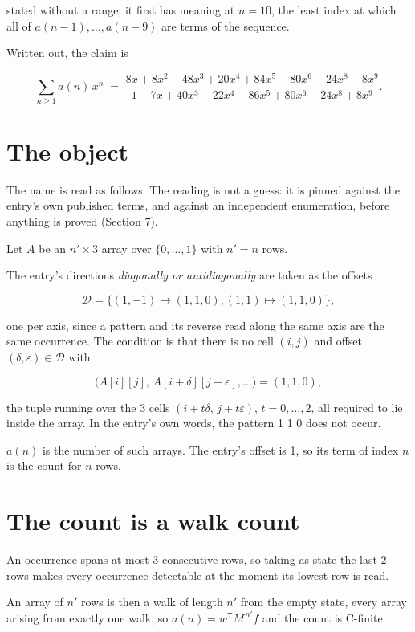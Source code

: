 \documentclass[11pt]{article}
\theoremstyle{definition}
\begin{document}
stated without a range; it first has meaning at $n = 10$, the least index at which all of $a(n-1),\dots,a(n-9)$ are terms of the sequence.

Written out, the claim is

\[\sum_{n \ge 1} a(n)\,x^n \;=\; \frac{8x + 8x^{2} - 48x^{3} + 20x^{4} + 84x^{5} - 80x^{6} + 24x^{8} - 8x^{9}}{1 - 7x + 40x^{3} - 22x^{4} - 86x^{5} + 80x^{6} - 24x^{8} + 8x^{9}}.\]

\section{The object}

The name is read as follows. The reading is not a guess: it is pinned against the entry's own published terms, and against an independent enumeration, before anything is proved (Section 7).

Let $A$ be an $n' \times 3$ array over $\{0,\dots,1\}$ with $n' = n$ rows.

The entry's directions {\itshape diagonally or antidiagonally} are taken as the offsets

\[\mathcal{D} = \{(1,-1)\mapsto(1,1,0), (1,1)\mapsto(1,1,0)\},\]

one per axis, since a pattern and its reverse read along the same axis are the same occurrence. The condition is that there is no cell $(i,j)$ and offset $(\delta,\varepsilon)\in\mathcal{D}$ with

\[\bigl(A[i][j],\,A[i{+}\delta][j{+}\varepsilon],\dots\bigr) = (1, 1, 0),\]

the tuple running over the $3$ cells $(i+t\delta,\,j+t\varepsilon)$, $t = 0,\dots,2$, all required to lie inside the array. In the entry's own words, the pattern 1 1 0 does not occur.

$a(n)$ is the number of such arrays. The entry's offset is 1, so its term of index $n$ is the count for $n$ rows.

\section{The count is a walk count}

An occurrence spans at most $3$ consecutive rows, so taking as state the last $2$ rows makes every occurrence detectable at the moment its lowest row is read.

An array of $n'$ rows is then a walk of length $n'$ from the empty state, every array arising from exactly one walk, so $a(n) = w^{\mathsf T}M^{\,n'}f$ and the count is C-finite.
\end{document}
